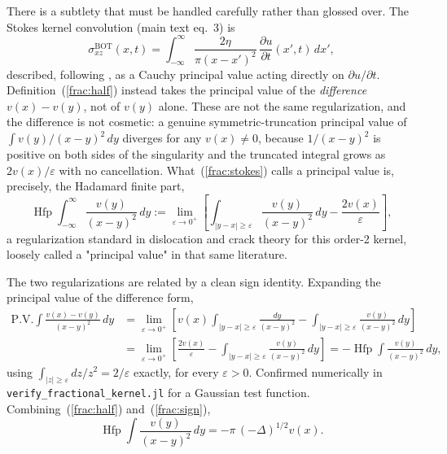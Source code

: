 \documentclass{article}
\newcommand{\Hfp}{\operatorname{Hfp}}
\begin{document}
There is a subtlety that must be handled carefully rather than glossed
over. The Stokes kernel convolution (main text eq.~3) is
\begin{equation}
\sigma_{xz}^{\mathrm{BOT}}(x,t) = \int_{-\infty}^{\infty}
  \frac{2\eta}{\pi(x-x')^2}\,\frac{\partial u}{\partial t}(x',t)\,dx',
\label{frac:stokes}
\end{equation}
described, following \citet{savage1978asthenosphere}, as a Cauchy principal
value acting directly on $\partial u/\partial t$. Definition~(\ref{frac:half})
instead takes the principal value of the \emph{difference} $v(x)-v(y)$, not
of $v(y)$ alone. These are not the same regularization, and the difference is
not cosmetic: a genuine symmetric-truncation principal value of
$\int v(y)/(x-y)^2\,dy$ diverges for any $v(x)\neq0$, because $1/(x-y)^2$ is
positive on both sides of the singularity and the truncated integral grows
as $2v(x)/\varepsilon$ with no cancellation. What~(\ref{frac:stokes}) calls a
principal value is, precisely, the Hadamard finite part,
\begin{equation}
\Hfp\!\int_{-\infty}^{\infty}\frac{v(y)}{(x-y)^2}\,dy
:= \lim_{\varepsilon\to0^+}\left[
    \int_{|y-x|\ge\varepsilon}\frac{v(y)}{(x-y)^2}\,dy - \frac{2v(x)}{\varepsilon}
  \right],
\label{frac:hfp}
\end{equation}
a regularization standard in dislocation and crack theory for this
order-2 kernel, loosely called a "principal value" in that same literature.

The two regularizations are related by a clean sign identity. Expanding the
principal value of the difference form,
\begin{align}
\mathrm{P.V.}\!\int\frac{v(x)-v(y)}{(x-y)^2}\,dy
&= \lim_{\varepsilon\to0^+}\left[
     v(x)\!\int_{|y-x|\ge\varepsilon}\!\frac{dy}{(x-y)^2}
     - \int_{|y-x|\ge\varepsilon}\!\frac{v(y)}{(x-y)^2}\,dy
   \right] \nonumber\\
&= \lim_{\varepsilon\to0^+}\left[
     \frac{2v(x)}{\varepsilon}
     - \int_{|y-x|\ge\varepsilon}\!\frac{v(y)}{(x-y)^2}\,dy
   \right]
 = -\Hfp\!\int\frac{v(y)}{(x-y)^2}\,dy,
\label{frac:sign}
\end{align}
using $\int_{|z|\ge\varepsilon}dz/z^2 = 2/\varepsilon$ exactly, for every
$\varepsilon>0$. Confirmed numerically in
\texttt{verify\_fractional\_kernel.jl} for a Gaussian test function.
Combining~(\ref{frac:half}) and~(\ref{frac:sign}),
\begin{equation}
\Hfp\!\int\frac{v(y)}{(x-y)^2}\,dy = -\pi\,(-\Delta)^{1/2}v(x).
\label{frac:hfp_final}
\end{equation}
\end{document}
